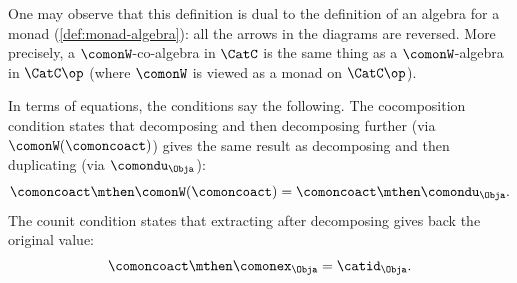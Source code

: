 \begin{remark}
\label{rem:coalgebra-duality}
One may observe that this definition is dual to the definition of an algebra for a monad (\cref{def:monad-algebra}): all the arrows in the diagrams are reversed.
More precisely, a $\comonW$-co-algebra in $\CatC$ is the same thing as a $\comonW$-algebra in $\CatC\op$ (where $\comonW$ is viewed as a monad on $\CatC\op$).
\end{remark}

\begin{remark}
\label{rem:coalgebra-conditions-spelled-out}
In terms of equations, the conditions say the following.
The cocomposition condition states that decomposing and then decomposing further (via $\comonW(\comoncoact)$) gives the same result as decomposing and then duplicating (via $\comondu_\Obja$):
\begin{equation}
\comoncoact \mthen \comonW(\comoncoact) = \comoncoact \mthen \comondu_\Obja.
\end{equation}
The counit condition states that extracting after decomposing gives back the original value:
\begin{equation}
\comoncoact \mthen \comonex_\Obja = \catid_\Obja.
\end{equation}
\end{remark}


